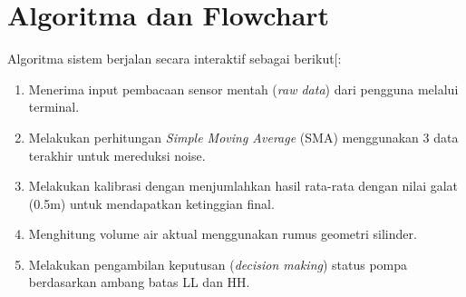 \documentclass[12pt,a4paper]{article}
\begin{document}
\section{Algoritma dan Flowchart}
Algoritma sistem berjalan secara interaktif sebagai berikut[:
\begin{enumerate}
    \item Menerima input pembacaan sensor mentah (\textit{raw data}) dari pengguna melalui terminal.
    \item Melakukan perhitungan \textit{Simple Moving Average} (SMA) menggunakan 3 data terakhir untuk mereduksi noise.
    \item Melakukan kalibrasi dengan menjumlahkan hasil rata-rata dengan nilai galat (0.5m) untuk mendapatkan ketinggian final.
    \item Menghitung volume air aktual menggunakan rumus geometri silinder.
    \item Melakukan pengambilan keputusan (\textit{decision making}) status pompa berdasarkan ambang batas LL dan HH.
\end{enumerate}
\end{document}
